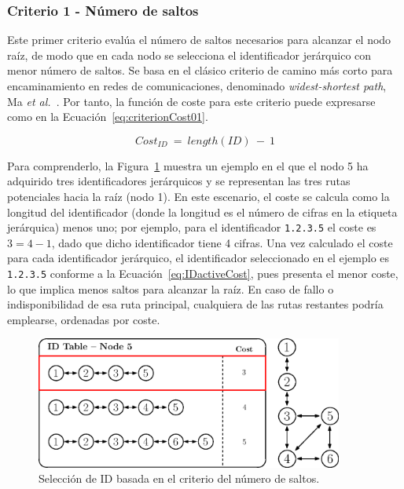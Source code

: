 \subsubsection{Criterio 1 - Número de saltos}

Este primer criterio evalúa el número de saltos necesarios para alcanzar el nodo raíz, de modo que en cada nodo se selecciona el identificador jerárquico con menor número de saltos. Se basa en el clásico criterio de camino más corto para encaminamiento en redes de comunicaciones, denominado \emph{widest-shortest path}, Ma \textit{et al.}~\cite{Ma97}. Por tanto, la función de coste para este criterio puede expresarse como en la Ecuación~\ref{eq:criterionCost01}. 

\begin{equation}\label{eq:criterionCost01}
     Cost_{ID}  \: = \: length(ID) \: - \: 1
\end{equation}
\vspace{0.2cm}

Para comprenderlo, la Figura~\ref{fig:den2ne_05} muestra un ejemplo en el que el nodo 5 ha adquirido tres identificadores jerárquicos y se representan las tres rutas potenciales hacia la raíz (nodo 1). En este escenario, el coste se calcula como la longitud del identificador (donde la longitud es el número de cifras en la etiqueta jerárquica) menos uno; por ejemplo, para el identificador \texttt{1.2.3.5} el coste es $3 = 4 - 1$, dado que dicho identificador tiene 4 cifras. Una vez calculado el coste para cada identificador jerárquico, el identificador seleccionado en el ejemplo es \texttt{1.2.3.5} conforme a la Ecuación~\ref{eq:IDactiveCost}, pues presenta el menor coste, lo que implica menos saltos para alcanzar la raíz. En caso de fallo o indisponibilidad de esa ruta principal, cualquiera de las rutas restantes podría emplearse, ordenadas por coste. 

\begin{figure}[ht!]
    \centering
    \includegraphics[width=0.9\textwidth]{fig/05_den2ne/den2ne_05.eps}
    \caption{Selección de ID basada en el criterio del número de saltos.}
    \label{fig:den2ne_05}
\end{figure}


